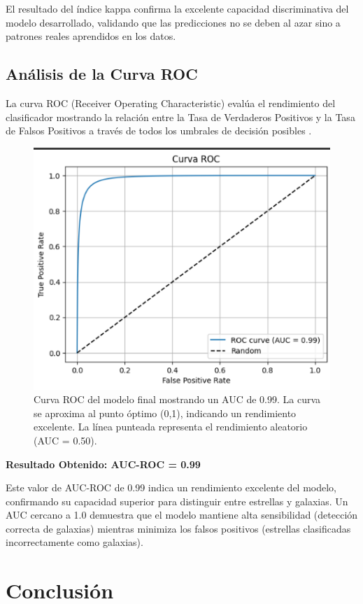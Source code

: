 \documentclass{article}
\begin{document}
El resultado del índice kappa confirma la excelente capacidad discriminativa del modelo desarrollado, validando que las predicciones no se deben al azar sino a patrones reales aprendidos en los datos.

\subsection{Análisis de la Curva ROC}

La curva ROC (Receiver Operating Characteristic) evalúa el rendimiento del clasificador mostrando la relación entre la Tasa de Verdaderos Positivos y la Tasa de Falsos Positivos a través de todos los umbrales de decisión posibles \cite{roc_analysis}.

\begin{figure}[H]
    \centering
    \includegraphics[width=0.6\linewidth]{ROC.png}
    \caption{Curva ROC del modelo final mostrando un AUC de 0.99. La curva se aproxima al punto óptimo (0,1), indicando un rendimiento excelente. La línea punteada representa el rendimiento aleatorio (AUC = 0.50).}
    \label{fig:roc_curve}
\end{figure}

\textbf{Resultado Obtenido: AUC-ROC = 0.99}

Este valor de AUC-ROC de 0.99 indica un rendimiento excelente del modelo, confirmando su capacidad superior para distinguir entre estrellas y galaxias. Un AUC cercano a 1.0 demuestra que el modelo mantiene alta sensibilidad (detección correcta de galaxias) mientras minimiza los falsos positivos (estrellas clasificadas incorrectamente como galaxias).

\newpage

\section{Conclusión}
\end{document}
